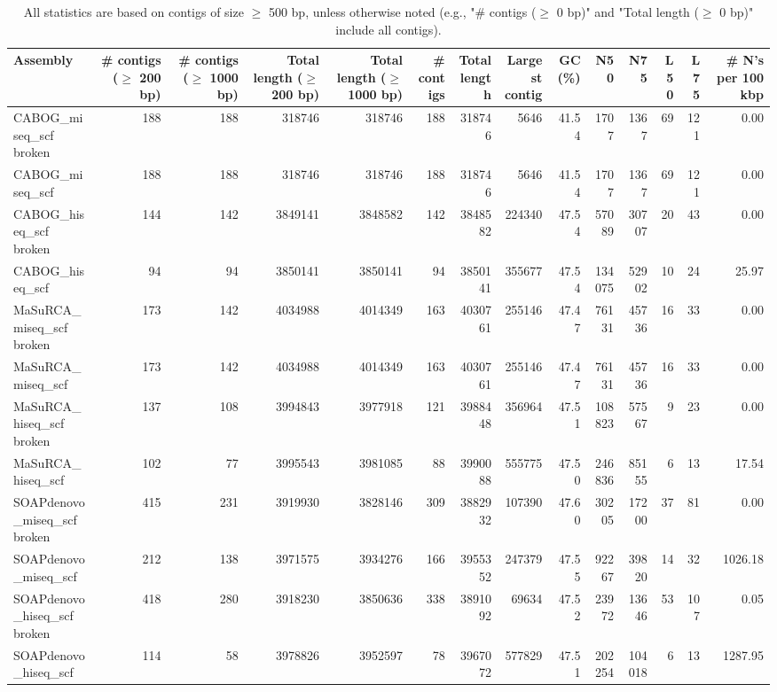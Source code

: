 \documentclass[12pt,a4paper]{article}
\begin{document}
\begin{table}[ht]
\begin{center}
\caption{All statistics are based on contigs of size $\geq$ 500 bp, unless otherwise noted (e.g., "\# contigs ($\geq$ 0 bp)" and "Total length ($\geq$ 0 bp)" include all contigs).}
\begin{tabular}{|l*{13}{|r}|}
\hline
Assembly & \# contigs ($\geq$ 200 bp) & \# contigs ($\geq$ 1000 bp) & Total length ($\geq$ 200 bp) & Total length ($\geq$ 1000 bp) & \# contigs & Total length & Largest contig & GC (\%) & N50 & N75 & L50 & L75 & \# N's per 100 kbp \\ \hline
CABOG\_miseq\_scf broken & 188 & 188 & 318746 & 318746 & 188 & 318746 & 5646 & 41.54 & 1707 & 1367 & 69 & 121 & 0.00 \\ \hline
CABOG\_miseq\_scf & 188 & 188 & 318746 & 318746 & 188 & 318746 & 5646 & 41.54 & 1707 & 1367 & 69 & 121 & 0.00 \\ \hline
CABOG\_hiseq\_scf broken & 144 & 142 & 3849141 & 3848582 & 142 & 3848582 & 224340 & 47.54 & 57089 & 30707 & 20 & 43 & 0.00 \\ \hline
CABOG\_hiseq\_scf & 94 & 94 & 3850141 & 3850141 & 94 & 3850141 & 355677 & 47.54 & 134075 & 52902 & 10 & 24 & 25.97 \\ \hline
MaSuRCA\_miseq\_scf broken & 173 & 142 & 4034988 & 4014349 & 163 & 4030761 & 255146 & 47.47 & 76131 & 45736 & 16 & 33 & 0.00 \\ \hline
MaSuRCA\_miseq\_scf & 173 & 142 & 4034988 & 4014349 & 163 & 4030761 & 255146 & 47.47 & 76131 & 45736 & 16 & 33 & 0.00 \\ \hline
MaSuRCA\_hiseq\_scf broken & 137 & 108 & 3994843 & 3977918 & 121 & 3988448 & 356964 & 47.51 & 108823 & 57567 & 9 & 23 & 0.00 \\ \hline
MaSuRCA\_hiseq\_scf & 102 & 77 & 3995543 & 3981085 & 88 & 3990088 & 555775 & 47.50 & 246836 & 85155 & 6 & 13 & 17.54 \\ \hline
SOAPdenovo\_miseq\_scf broken & 415 & 231 & 3919930 & 3828146 & 309 & 3882932 & 107390 & 47.60 & 30205 & 17200 & 37 & 81 & 0.00 \\ \hline
SOAPdenovo\_miseq\_scf & 212 & 138 & 3971575 & 3934276 & 166 & 3955352 & 247379 & 47.55 & 92267 & 39820 & 14 & 32 & 1026.18 \\ \hline
SOAPdenovo\_hiseq\_scf broken & 418 & 280 & 3918230 & 3850636 & 338 & 3891092 & 69634 & 47.52 & 23972 & 13646 & 53 & 107 & 0.05 \\ \hline
SOAPdenovo\_hiseq\_scf & 114 & 58 & 3978826 & 3952597 & 78 & 3967072 & 577829 & 47.51 & 202254 & 104018 & 6 & 13 & 1287.95 \\ \hline

\end{tabular}
\end{center}
\end{table}
\end{document}
